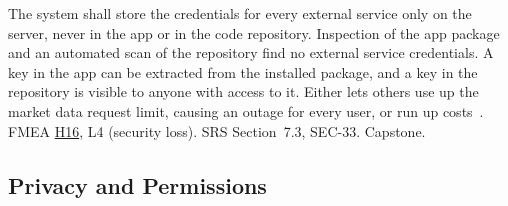\documentclass{article}
\newcommand{\hazref}[1]{\hyperref[#1]{#1}}
\begin{document}
\begin{description}
{The system shall store the credentials for every external service only on the
server, never in the app or in the code repository.}
{Inspection of the app package and an automated scan of the repository find no
external service credentials.}
{A key in the app can be extracted from the installed package, and a key in
the repository is visible to anyone with access to it. Either lets others use
up the market data request limit, causing an outage for every user, or run up
costs~\cite{OWASPMASVS}.}
{FMEA \hazref{H16}, L4 (security loss).}
{SRS Section~7.3, SEC-33.}
{Capstone.}

\end{description}

\subsection{Privacy and Permissions}
\end{document}
